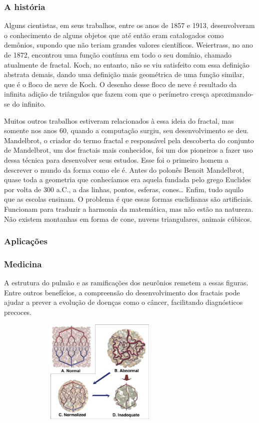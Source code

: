 \documentclass{beamer}
\begin{document}
\begin{frame}
\frametitle{A história}
Alguns cientistas, em seus trabalhos, entre os anos de 1857 e 1913, desenvolveram o conhecimento de alguns objetos que até então eram catalogados como demônios, supondo que não teriam grandes valores científicos. Weiertrass, no ano de 1872, encontrou uma função contínua em todo o seu domínio, chamado atualmente de fractal. Koch, no entanto, não se viu satisfeito com essa definição abstrata demais, dando uma definição mais geométrica de uma função similar, que é o floco de neve de Koch. O desenho desse floco de neve é resultado da infinita adição de triângulos que fazem com que o perímetro cresça aproximando-se do infinito.
\end{frame}
\begin{frame}
Muitos outros trabalhos estiveram relacionados à essa ideia do fractal, mas somente nos anos 60, quando a computação surgiu, seu desenvolvimento se deu. Mandelbrot, o criador do termo fractal e responsável pela descoberta do conjunto de Mandelbrot, um dos fractais mais conhecidos, foi um dos pioneiros a fazer uso dessa técnica para desenvolver seus estudos.
Esse foi o primeiro homem a descrever o mundo da forma como ele é. Antes do polonês Benoit Mandelbrot, quase toda a geometria que conhecíamos era aquela fundada pelo grego Euclides por volta de 300 a.C., a das linhas, pontos, esferas, cones… Enfim, tudo aquilo que as escolas ensinam. O problema é que essas formas euclidianas são artificiais. Funcionam para traduzir a harmonia da matemática, mas não estão na natureza. Não existem montanhas em forma de cone, nuvens triangulares, animais cúbicos. 
\end{frame}
\begin{frame}
\frametitle{Aplicações}
\end{frame}
\begin{frame}
\frametitle{Medicina}
A estrutura do pulmão e as ramificações dos neurônios remetem a essas figuras. Entre outros benefícios, a compreensão do desenvolvimento dos fractais pode ajudar a prever a evolução de doenças como o câncer, facilitando diagnósticos precoces.
\end{frame}
\begin{frame}
	\begin{figure}[htb]
	\centering
    	    \includegraphics[width=8cm, height=5cm]{images/medicina.jpg}
       	        \vspace{0.01em}
	\end{figure}
\end{frame}
\end{document}
